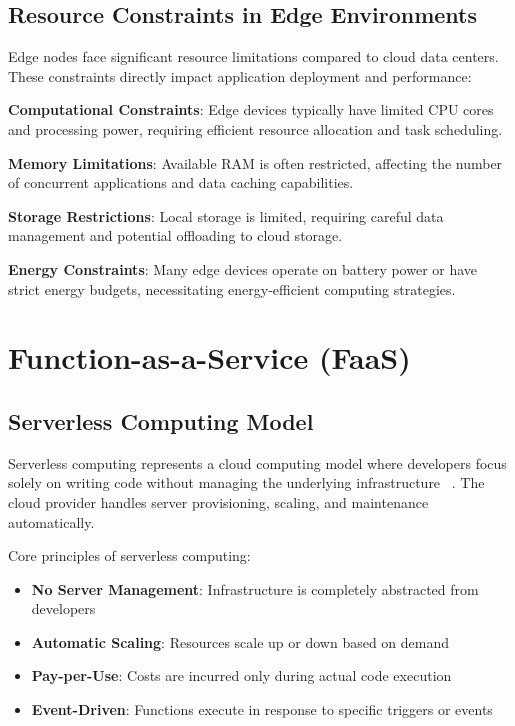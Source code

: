 \subsection{Resource Constraints in Edge Environments}

Edge nodes face significant resource limitations compared to cloud data centers. These constraints directly impact application deployment and performance:

\textbf{Computational Constraints}: Edge devices typically have limited CPU cores and processing power, requiring efficient resource allocation and task scheduling.

\textbf{Memory Limitations}: Available RAM is often restricted, affecting the number of concurrent applications and data caching capabilities.

\textbf{Storage Restrictions}: Local storage is limited, requiring careful data management and potential offloading to cloud storage.

\textbf{Energy Constraints}: Many edge devices operate on battery power or have strict energy budgets, necessitating energy-efficient computing strategies.

\section{Function-as-a-Service (FaaS)}

\subsection{Serverless Computing Model}

Serverless computing represents a cloud computing model where developers focus solely on writing code without managing the underlying infrastructure ~\cite{baldini2017serverless}. The cloud provider handles server provisioning, scaling, and maintenance automatically.

Core principles of serverless computing:
\begin{itemize}
    \item \textbf{No Server Management}: Infrastructure is completely abstracted from developers
    \item \textbf{Automatic Scaling}: Resources scale up or down based on demand
    \item \textbf{Pay-per-Use}: Costs are incurred only during actual code execution
    \item \textbf{Event-Driven}: Functions execute in response to specific triggers or events
\end{itemize}

